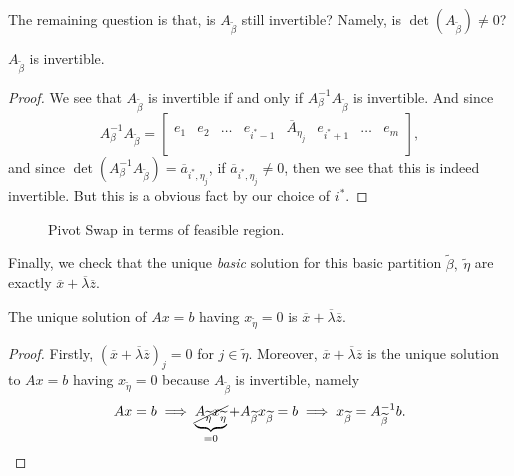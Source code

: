 The remaining question is that, is \(A_{\widetilde{\beta}}\) still invertible? Namely, is \(\det(A_{\widetilde{\beta}}) \neq 0\)?
\begin{lemma}
	\(A_{\widetilde{\beta}}\) is invertible.
\end{lemma}
\begin{proof}
	We see that \(A_{\widetilde{\beta}}\) is invertible if and only if \(A^{-1}_{\beta}A_{\widetilde{\beta}}\) is invertible. And since
	\[
		A^{-1}_{\beta}A_{\widetilde{\beta}} = \begin{bmatrix}
			e_1 & e_2 & \ldots & e_{i^{*}-1} & \overline{A}_{\eta_{j}} & e_{i^{*}+1} & \ldots & e_m \\
		\end{bmatrix},
	\]
	and since \(\det(A^{-1}_\beta A_{\widetilde{\beta}}) = \overline{a}_{i^{*}, \eta_{j}}\), if \(\overline{a}_{i^{*}, \eta_{j}}\neq 0\), then we see that this is indeed invertible. But this is
	a obvious fact by our choice of \(i^{*}\).
\end{proof}

\begin{figure}[H]
	\centering
	\caption{Pivot Swap in terms of feasible region.}
	\label{fig:pivot-swap}
\end{figure}

Finally, we check that the unique \emph{basic} solution for this basic partition \(\widetilde{\beta},\ \widetilde{\eta}\) are exactly \(\overline{x} + \overline{\lambda}\overline{z}\).
\begin{lemma}
	The unique solution of \(Ax = b\) having \(x_{\widetilde{\eta}} = 0\) is \(\overline{x} + \overline{\lambda}\overline{z}\).
\end{lemma}
\begin{proof}
	Firstly, \((\overline{x} + \overline{\lambda}\overline{z})_j = 0\) for \(j\in \widetilde{\eta}\). Moreover, \(\overline{x} + \overline{\lambda}\overline{z}\) is
	the unique solution to \(Ax = b\) having \(x_{\widetilde{\eta}} = 0\) because \(A_{\widetilde{\beta}}\) is invertible, namely
	\[
		Ax = b \implies \underbrace{\cancel{A_{\widetilde{\eta}}x_{\widetilde{\eta}}}}_{=0} + A_{\widetilde{\beta}}x_{\widetilde{\beta}} = b \implies x_{\widetilde{\beta}} = A^{-1}_{\widetilde{\beta}}b.
	\]
\end{proof}